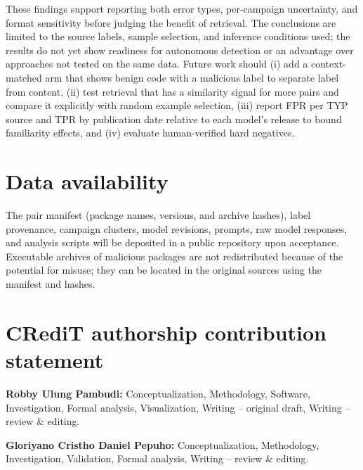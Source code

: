 \documentclass[a4paper,fleqn]{cas-dc}
\begin{document}
These findings support reporting both error types, per-campaign uncertainty, and
format sensitivity before judging the benefit of retrieval. The conclusions are
limited to the source labels, sample selection, and inference conditions used;
the results do not yet show readiness for autonomous detection or an advantage
over approaches not tested on the same data. Future work should (i) add a context-matched arm that shows benign code with a
malicious label to separate label from content, (ii) test retrieval that has a
similarity signal for more pairs and compare it explicitly with random example
selection, (iii) report FPR per TYP source and TPR by publication date relative
to each model's release to bound familiarity effects, and (iv) evaluate
human-verified hard negatives.


\section*{Data availability}

The pair manifest (package names, versions, and archive hashes), label
provenance, campaign clusters, model revisions, prompts, raw model responses, and
analysis scripts will be deposited in a public repository upon acceptance.
Executable archives of malicious packages are not redistributed because of the
potential for misuse; they can be located in the original sources using the
manifest and hashes.

\section*{CRediT authorship contribution statement}

\noindent
\textbf{Robby Ulung Pambudi:}
Conceptualization, Methodology, Software, Investigation, Formal analysis,
Visualization, Writing -- original draft, Writing -- review \& editing.

\noindent
\textbf{Gloriyano Cristho Daniel Pepuho:}
Conceptualization, Methodology, Investigation, Validation, Formal analysis,
Writing -- review \& editing.
\end{document}
